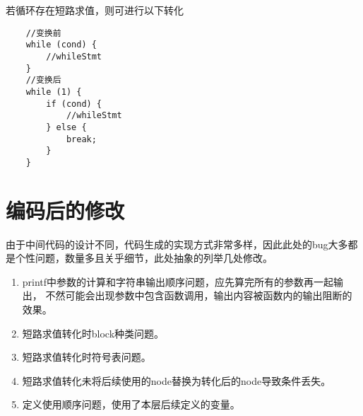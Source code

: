 若循环存在短路求值，则可进行以下转化
\begin{verbatim}
    //变换前
    while (cond) {
        //whileStmt
    }
    //变换后
    while (1) {
        if (cond) {
            //whileStmt
        } else {
            break;
        }
    }
\end{verbatim}


\section{编码后的修改}
由于中间代码的设计不同，代码生成的实现方式非常多样，因此此处的bug大多都是个性问题，数量多且关乎细节，此处抽象的列举几处修改。
\begin{enumerate}
    \item printf中参数的计算和字符串输出顺序问题，应先算完所有的参数再一起输出，
    不然可能会出现参数中包含函数调用，输出内容被函数内的输出阻断的效果。
    \item 短路求值转化时block种类问题。
    \item 短路求值转化时符号表问题。
    \item 短路求值转化未将后续使用的node替换为转化后的node导致条件丢失。
    \item 定义使用顺序问题，使用了本层后续定义的变量。
\end{enumerate}